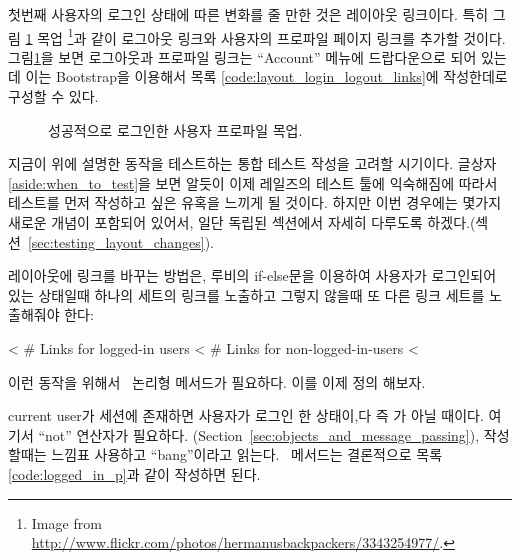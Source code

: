 첫번째 사용자의 로그인 상태에 따른 변화를 줄 만한 것은 레이아웃 링크이다. 특히 그림 \ref{fig:login_success_mockup} 목업 \footnote{Image from \href{http://www.flickr.com/photos/hermanusbackpackers/3343254977/}{http://www.flickr.com/photos/hermanusbackpackers/3343254977/}.}과 같이 로그아웃 링크와 사용자의 프로파일 페이지 링크를 추가할 것이다. 그림\ref{fig:login_success_mockup}을 보면 로그아웃과 프로파일 링크는 ``Account'' 메뉴에 드랍다운으로 되어 있는데 이는 Bootstrap을 이용해서 목록 \ref{code:layout_login_logout_links}에 작성한데로 구성할 수 있다. 

\begin{figure} \begin{center}  \end{center} \caption{성공적으로 로그인한 사용자 프로파일 목업.\label{fig:login_success_mockup}} \end{figure} 

지금이 위에 설명한 동작을 테스트하는 통합 테스트 작성을 고려할 시기이다. 글상자 \ref{aside:when_to_test}을 보면 알듯이 이제 레일즈의 테스트 툴에 익숙해짐에 따라서 테스트를 먼저 작성하고 싶은 유혹을 느끼게 될 것이다. 하지만 이번 경우에는 몇가지 새로운 개념이 포함되어 있어서, 일단 독립된 섹션에서 자세히 다루도록 하겠다.(섹션~\ref{sec:testing_layout_changes}). 

레이아웃에 링크를 바꾸는 방법은, 루비의 if-else문을 이용하여 사용자가 로그인되어 있는 상태일때 하나의 세트의 링크를 노출하고 그렇지 않을때 또 다른 링크 세트를 노출해줘야 한다: 

\begin{code} < # Links for logged-in users < # Links for non-logged-in-users < \end{code} 

\noindent 이런 동작을 위해서 \ 논리형 메서드가 필요하다. 이를 이제 정의 해보자. 

current user가 세션에 존재하면 사용자가 로그인 한 상태이,다 \linebreak 즉 가  아닐 때이다. 여기서 ``not'' 연산자가 필요하다. (Section~\ref{sec:objects_and_message_passing}), 작성할때는 느낌표 \kode{!} 사용하고 ``bang''이라고 읽는다. \ 메서드는 결론적으로 목록 \ref{code:logged_in_p}과 같이 작성하면 된다. 

